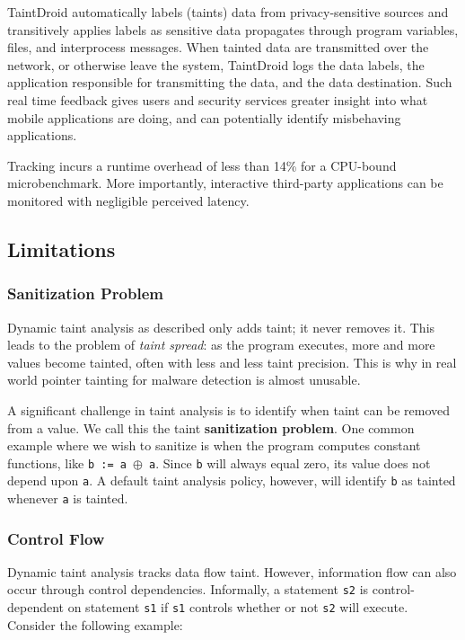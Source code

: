 TaintDroid automatically labels (taints) data from privacy-sensitive sources and transitively applies labels as sensitive data propagates through program variables, files, and interprocess messages. When tainted data are transmitted over the network, or otherwise leave the system, TaintDroid logs the data labels, the application responsible for transmitting the data, and the data destination. Such real time feedback gives users and security services greater insight into what mobile applications are doing, and can potentially identify misbehaving applications. 

Tracking incurs a runtime overhead of less than 14\% for a CPU-bound microbenchmark. More importantly, interactive third-party applications can be monitored with negligible perceived latency.

\subsection{Limitations}
\subsubsection{Sanitization Problem}
Dynamic taint analysis as described only adds taint; it never removes it. This leads to the problem of \textit{taint spread}: as the program executes, more and more values become tainted, often with less and less taint precision. This is why in real world pointer tainting for malware detection is almost unusable.

A significant challenge in taint analysis is to identify when taint can be removed from a value. We call this the taint \textbf{sanitization problem}. One common example where we wish to sanitize is when the program computes constant functions, like \texttt{b := a $\oplus$ a}. Since \texttt{b} will always equal zero, its value does not depend upon \texttt{a}. A default taint analysis policy, however, will identify \texttt{b} as tainted whenever \texttt{a} is tainted.

\subsubsection{Control Flow}
Dynamic taint analysis tracks data flow taint. However, information flow can also occur through control dependencies. Informally, a statement \texttt{s2} is control-dependent on statement \texttt{s1} if \texttt{s1} controls whether or not \texttt{s2} will execute. Consider the following example:

